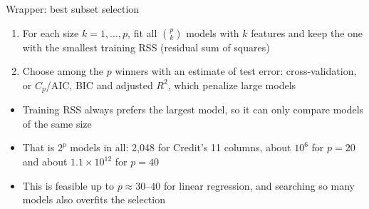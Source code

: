 
\begin{frame}{Wrapper: best subset selection}
    \begin{enumerate}
        \item For each size $k = 1, \dots, p$, fit all $\binom{p}{k}$ models with $k$ features and keep the one with the smallest training RSS (residual sum of squares)
        \item Choose among the $p$ winners with an estimate of test error: cross-validation, or $C_p$/AIC, BIC and adjusted $R^2$, which penalize large models
    \end{enumerate}
    \svspace{0.5em}
    \begin{itemize}
        \item Training RSS always prefers the largest model, so it can only compare models of the same size
        \item That is $2^p$ models in all: 2{,}048 for Credit's 11 columns, about $10^6$ for $p = 20$ and about $1.1 \times 10^{12}$ for $p = 40$
        \item This is feasible up to $p \approx 30$--$40$ for linear regression, and searching so many models also overfits the selection
    \end{itemize}
\end{frame}


